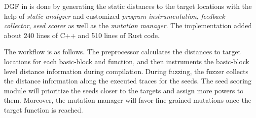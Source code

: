 DGF in {\FOT} is done by generating the static distances to the target locations with the help of \emph{static analyzer} and customized \emph{program instrumentation}, \emph{feedback collector}, \emph{seed scorer} as well as the \emph{mutation manager}. The implementation added about 240 lines of C++ and 510 lines of Rust code.

The workflow is as follows.
The preprocessor calculates the distances to target locations for each basic-block and function, and then instruments the basic-block level distance information during compilation.
During fuzzing, the fuzzer collects the distance information along the executed traces for the seeds.
The seed scoring module will prioritize the seeds closer to the targets and assign more powers to them. 
Moreover, the mutation manager will favor fine-grained mutations once the target function is reached.



